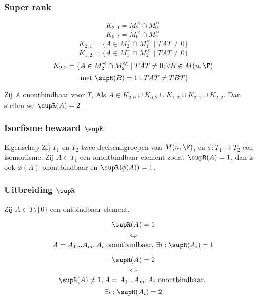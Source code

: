 \begin{frame}
\frametitle{Super rank}

\begin{block}{}
$$K_{2,0} = M_{2}^{\prec} \cap M_{0}^{\ll}$$
$$K_{0,2} = M_{0}^{\prec} \cap M_{2}^{\ll}$$
$$K_{2,1} = \{ A \in M_{2}^{\prec} \cap M_{1}^{\ll} \; | \; TAT \neq 0  \}$$
$$K_{1,2} = \{ A \in M_{1}^{\prec} \cap M_{2}^{\ll} \; | \; TAT \neq 0  \}$$
$$K_{2,2} = \{ A \in M_{2}^{\prec} \cap M_{2}^{\ll} \; | \; TAT \neq 0; \forall B \in M(n,\F)$$
$$ \text{ met } \supR(B) = 1 : TAT \neq TBT \}$$
\end{block}

\begin{block}{}
Zij $A$ onontbindbaar voor $T$, Als $A \in K_{2,0} \cup K_{0,2} \cup K_{1,2} \cup K_{2,1} \cup K_{2,2}$. Dan stellen we $\supR(A) = 2$.
\end{block}

\end{frame}


\begin{frame}
\frametitle{Isorfisme bewaard $\supR$}

\begin{block}{Eigenschap}
Zij $T_1$ en $T_2$ twee deelsemigroepen van $M(n,\F)$, en $\phi :T_1 \to T_2$ een isomorfisme. Zij $A \in T_1$ een onontbindbaar element zodat $\supR(A) = 1$, dan is ook $\phi(A)$ onontbindbaar en $\supR(\phi(A)) = 1$.
\end{block}

\end{frame}


\begin{frame}
\frametitle{Uitbreiding $\supR$}

\begin{block}{}
Zij $A \in T\setminus \{0 \}$ een ontbindbaar element,
\end{block}


\begin{block}{}
$$\supR(A) = 1$$
$$\Leftrightarrow$$
$$A = A_1...A_m, A_i \text{ onontbindbaar, } \exists i : \supR(A_i) = 1$$
\end{block}

\begin{block}{}
$$\supR(A) = 2$$
$$\Leftrightarrow$$
$$\supR(A) \neq 1, A = A_1...A_m, A_i \text{ onontbindbaar, } $$
$$\exists i : \supR(A_i) = 2$$
\end{block}

\end{frame}


